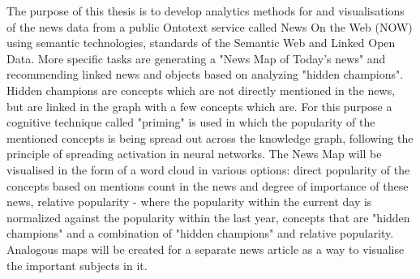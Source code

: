 
The purpose of this thesis is to develop analytics methods for and visualisations of the news data from a public Ontotext service called News On the Web (NOW) using semantic technologies, standards of the Semantic Web and Linked Open Data. More specific tasks are generating a "News Map of Today's news" and recommending linked news and objects based on analyzing "hidden champions". Hidden champions are concepts which are not directly mentioned in the news, but are linked in the graph with a few concepts which are. For this purpose a cognitive technique called "priming" is used in which the popularity of the mentioned concepts is being spread out across the knowledge graph, following the principle of spreading activation in neural networks. The News Map will be visualised in the form of a word cloud in various options: direct popularity of the concepts based on mentions count in the news and degree of importance of these news, relative popularity - where the popularity within the current day is normalized against the popularity within the last year, concepts that are "hidden champions" and a combination of "hidden champions" and relative popularity. Analogous maps will be created for a separate news article as a way to visualise the important subjects in it.
